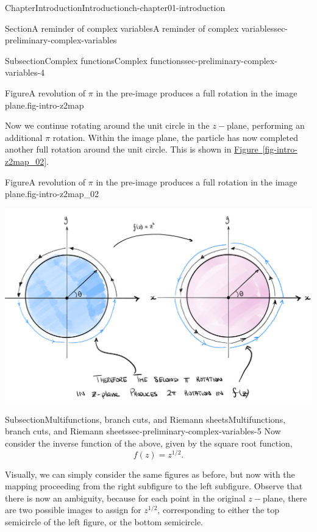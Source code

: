 \documentclass[oneside,10pt,]{book}
\newcommand{\xreffont}{\relax}
\numberwithin{equation}{section}
\begin{document}
\begin{chapterptx}{Chapter}{Introduction}{}{Introduction}{}{}{ch-chapter01-introduction}
\begin{sectionptx}{Section}{A reminder of complex variables}{}{A reminder of complex variables}{}{}{sec-preliminary-complex-variables}
\begin{subsectionptx}{Subsection}{Complex functions}{}{Complex functions}{}{}{sec-preliminary-complex-variables-4}
\begin{figureptx}{Figure}{A revolution of \(\pi\) in the pre-image produces a full rotation in the image plane.}{fig-intro-z2map}{}
\begin{image}{0}{1}{0}{}
\end{image}%
\tcblower
\end{figureptx}%
Now we continue rotating around the unit circle in the \(z-\)plane, performing an additional \(\pi\) rotation. Within the image plane, the particle has now completed another full rotation around the unit circle. This is shown in \hyperref[fig-intro-z2map_02]{Figure~{\xreffont\ref{fig-intro-z2map_02}}}.%
\begin{figureptx}{Figure}{A revolution of \(\pi\) in the pre-image produces a full rotation in the image plane.}{fig-intro-z2map_02}{}%
\begin{image}{0}{1}{0}{}%
\includegraphics[width=\linewidth]{external/intro_z2map_02.jpg}
\end{image}%
\tcblower
\end{figureptx}%
\end{subsectionptx}
%
%
\typeout{************************************************}
\typeout{************************************************}
%
\begin{subsectionptx}{Subsection}{Multifunctions, branch cuts, and Riemann sheets}{}{Multifunctions, branch cuts, and Riemann sheets}{}{}{sec-preliminary-complex-variables-5}
Now consider the inverse function of the above, given by the square root function,%
\begin{equation*}
f(z) = z^{1/2}.
\end{equation*}
%
\par
Visually, we can simply consider the same figures as before, but now with the mapping proceeding from the right subfigure to the left subfigure. Observe that there is now an ambiguity, because for each point in the original \(z-\)plane, there are two possible images to assign for \(z^{1/2}\), corresponding to either the top semicircle of the left figure, or the bottom semicircle.%

\end{subsectionptx}
\end{sectionptx}
\end{chapterptx}
\end{document}
